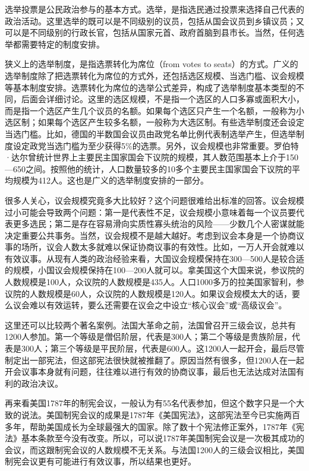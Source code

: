 
选举投票是公民政治参与的基本方式。选举，是指选民通过投票来选择自己代表的政治活动。这里选举的既可以是不同级别的议员，包括从国会议员到乡镇议员；又可以是不同级别的行政长官，包括从国家元首、政府首脑到县市长。当然，任何选举都需要特定的制度安排。

狭义上的选举制度，是指选票转化为席位（from votes to seats）的方式。广义的选举制度除了把选票转化为席位的方式外，还包括选区规模、当选门槛、议会规模等基本制度安排。选票转化为席位的选举公式差异，构成了选举制度基本类型的不同，后面会详细讨论。这里的选区规模，不是指一个选区的人口多寡或面积大小，而是指一个选区产生几个议员的名额。如果每个选区只产生一个名额，一般称为小选区制；如果每个选区产生较多名额，一般称为大选区制。有些选举制度还会设定当选门槛。比如，德国的半数国会议员由政党名单比例代表制选举产生，但选举制度设定政党当选门槛为至少获得5\%的选票。另外，议会规模也非常重要。罗伯特·达尔曾统计世界上主要民主国家国会下议院的规模，其人数范围基本上介于150—650之间。按照他的统计，人口数量较多的10多个主要民主国家国会下议院的平均规模为412人。这也是广义的选举制度安排的一部分。

很多人关心，议会规模究竟多大比较好？这个问题很难给出标准的回答。议会规模过小可能会导致两个问题：第一是代表性不足，议会规模小意味着每一个议员要代表更多选民；第二是存在容易滑向实质性寡头统治的风险——少数几个人密谋就能决定重要公共事务。当然，议会规模不是越大越好。考虑到议会本身是一个协商议事的场所，议会人数太多就难以保证协商议事的有效性。比如，一万人开会就难以有效议事。从现有人类的政治经验来看，大国议会规模保持在300—500人是较合适的规模，小国议会规模保持在100—200人就可以。拿美国这个大国来说，参议院的人数规模是100人，众议院的人数规模是435人。人口1000多万的拉美国家智利，参议院的人数规模是60人，众议院的人数规模是120人。如果议会规模太大的话，要么议会难以有效运转，要么还需要在议会之中设立“核心议会”或“高级议会”。

这里还可以比较两个著名案例。法国大革命之前，法国曾召开三级会议，总共有1200人参加。第一个等级是僧侣阶层，代表是300人；第二个等级是贵族阶层，代表是300人；第三个等级是平民阶层，代表是600人。这1200人一起开会，最后尽管制定出一部宪法，但这部宪法很快就被推翻了。原因当然有很多，但1200人在一起开会议事本身就有问题，往往难以进行有效的协商议事，最后也无法达成对法国有利的政治决议。

再来看美国1787年的制宪会议，一般认为有55名代表参加，但这个数字只是一个大致的说法。美国制宪会议的成果是1787年《美国宪法》，这部宪法至今已实施两百多年，帮助美国成长为全球最强大的国家。除了数十个宪法修正案外，1787年《宪法》基本条款至今没有改变。所以，可以说1787年美国制宪会议是一次极其成功的会议，而这跟制宪会议的人数规模不无关系。与法国1200人的三级会议相比，美国制宪会议更有可能进行有效议事，所以结果也更好。

